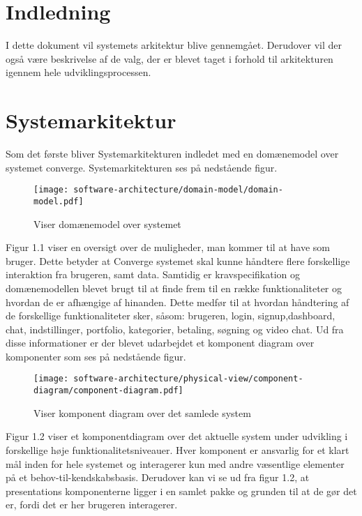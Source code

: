 
\chapter{Indledning}

I dette dokument vil systemets arkitektur blive gennemgået. 
Derudover vil der også være beskrivelse af de valg, der er blevet taget i forhold til arkitekturen igennem hele udviklingsprocessen. 
    
\chapter{Systemarkitektur}

Som det første bliver Systemarkitekturen indledet med en domænemodel over systemet converge. Systemarkitekturen ses på nedstående figur.

\begin{figure}[ht]
    \centering
\texttt{[image: software-architecture/domain-model/domain-model.pdf]}
\caption{Viser domænemodel over systemet}
\label{fig:figure4}
\end{figure}

Figur 1.1 viser en oversigt over de muligheder, man kommer til at have som bruger. Dette betyder at Converge systemet skal kunne håndtere flere forskellige interaktion fra brugeren, samt data. 
Samtidig er kravspecifikation og domænemodellen blevet brugt til at finde frem til en række funktionaliteter og hvordan de er afhængige af hinanden. Dette medfør til at hvordan håndtering af de forskellige funktionaliteter sker, såsom: brugeren, login, signup,dashboard, chat, indstillinger, portfolio, kategorier, betaling, søgning og video chat. Ud fra disse informationer er der blevet udarbejdet et komponent diagram over komponenter som ses på nedstående figur.

\begin{figure}[ht]
    \centering
\texttt{[image: software-architecture/physical-view/component-diagram/component-diagram.pdf]}
\caption{Viser komponent diagram over det samlede system}
\label{fig:figure2}
\end{figure}

Figur 1.2 viser et komponentdiagram over det aktuelle system under udvikling i forskellige høje funktionalitetsniveauer. Hver komponent er ansvarlig for et klart mål inden for hele systemet og interagerer kun med andre væsentlige elementer på et behov-til-kendskabsbasis. Derudover kan vi se ud fra figur 1.2, at presentations komponenterne ligger i en samlet pakke og grunden til at de gør det er, fordi det er her brugeren interagerer.

